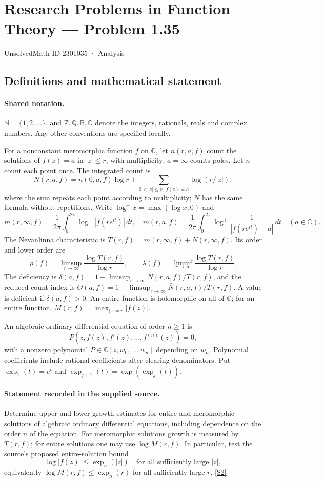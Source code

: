 \documentclass[11pt]{article}
\newcommand{\sref}[2]{\hyperlink{source:#1:#2}{[S#2]}}
\begin{document}
\setcounter{section}{2301034}
\section{Research Problems in Function Theory — Problem 1.35}\label{2301035}
{\small\sffamily UnsolvedMath ID 2301035 · Analysis}
\subsection{Definitions and mathematical statement}

\paragraph{Shared notation.}$\mathbb N=\{1,2,\ldots\}$, and $\mathbb Z,\mathbb Q,\mathbb R,\mathbb C$ denote the integers, rationals, reals and complex numbers. Any other conventions are specified locally.


For a nonconstant meromorphic function $f$ on $\mathbb C$, let $n(r,a,f)$ count the solutions of $f(z)=a$ in $|z|\le r$, with multiplicity; $a=\infty$ counts poles. Let $\bar n$ count each point once. The integrated count is
\[
 N(r,a,f)=n(0,a,f)\log r+\sum_{0<|z|\le r,\ f(z)=a}\log(r/|z|),
\]
where the sum repeats each point according to multiplicity; $\bar N$ has the same formula without repetitions. Write $\log^+x=\max(\log x,0)$ and
\[
 m(r,\infty,f)=\frac1{2\pi}\int_0^{2\pi}\log^+|f(re^{it})|\,dt,\quad
 m(r,a,f)=\frac1{2\pi}\int_0^{2\pi}\log^+\frac1{|f(re^{it})-a|}\,dt\quad(a\in\mathbb C).
\]
The Nevanlinna characteristic is $T(r,f)=m(r,\infty,f)+N(r,\infty,f)$. Its order and lower order are
\[
 \rho(f)=\limsup_{r\to\infty}\frac{\log T(r,f)}{\log r},\qquad
 \lambda(f)=\liminf_{r\to\infty}\frac{\log T(r,f)}{\log r}.
\]
The deficiency is $\delta(a,f)=1-\limsup_{r\to\infty}N(r,a,f)/T(r,f)$, and the reduced-count index is $\Theta(a,f)=1-\limsup_{r\to\infty}\bar N(r,a,f)/T(r,f)$. A value is deficient if $\delta(a,f)>0$. An entire function is holomorphic on all of $\mathbb C$; for an entire function, $M(r,f)=\max_{|z|=r}|f(z)|$.

An algebraic ordinary differential equation of order $n\ge1$ is
\[
 P(z,f(z),f'(z),\ldots,f^{(n)}(z))=0,
\]
with a nonzero polynomial $P\in\mathbb C[z,w_0,\ldots,w_n]$ depending on $w_n$. Polynomial coefficients include rational coefficients after clearing denominators. Put $\exp_1(t)=e^t$ and $\exp_{j+1}(t)=\exp(\exp_j(t))$.
\paragraph{Statement recorded in the supplied source.}
Determine upper and lower growth estimates for entire and meromorphic solutions of algebraic ordinary differential equations, including dependence on the order $n$ of the equation. For meromorphic solutions growth is measured by $T(r,f)$; for entire solutions one may use $\log M(r,f)$. In particular, test the source's proposed entire-solution bound
\[
 \log|f(z)|\le\exp_n(|z|)\quad\text{for all sufficiently large }|z|,
\]
equivalently $\log M(r,f)\le\exp_n(r)$ for all sufficiently large $r$. \sref{2301035}{2}
\end{document}
